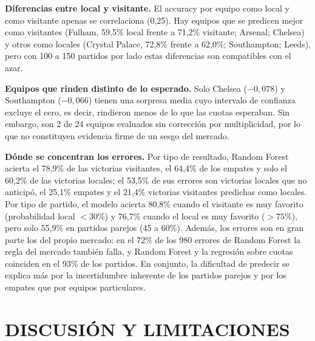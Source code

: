 \documentclass[12pt,letterpaper,oneside]{report}
\begin{document}
\textbf{Diferencias entre local y visitante.} El accuracy por equipo como local y como visitante apenas se correlaciona (0,25). Hay equipos que se predicen mejor como visitantes (Fulham, 59,5\% local frente a 71,2\% visitante; Arsenal; Chelsea) y otros como locales (Crystal Palace, 72,8\% frente a 62,0\%; Southampton; Leeds), pero con 100 a 150 partidos por lado estas diferencias son compatibles con el azar.

\textbf{Equipos que rinden distinto de lo esperado.} Solo Chelsea ($-0{,}078$) y Southampton ($-0{,}066$) tienen una sorpresa media cuyo intervalo de confianza excluye el cero, es decir, rindieron menos de lo que las cuotas esperaban. Sin embargo, son 2 de 24 equipos evaluados sin corrección por multiplicidad, por lo que no constituyen evidencia firme de un sesgo del mercado.

\textbf{Dónde se concentran los errores.} Por tipo de resultado, Random Forest acierta el 78,9\% de las victorias visitantes, el 64,4\% de los empates y solo el 60,2\% de las victorias locales; el 53,5\% de sus errores son victorias locales que no anticipó, el 25,1\% empates y el 21,4\% victorias visitantes predichas como locales. Por tipo de partido, el modelo acierta 80,8\% cuando el visitante es muy favorito (probabilidad local $<30\%$) y 76,7\% cuando el local es muy favorito ($>75\%$), pero solo 55,9\% en partidos parejos (45 a 60\%). Además, los errores son en gran parte los del propio mercado: en el 72\% de los 980 errores de Random Forest la regla del mercado también falla, y Random Forest y la regresión sobre cuotas coinciden en el 93\% de los partidos. En conjunto, la dificultad de predecir se explica más por la incertidumbre inherente de los partidos parejos y por los empates que por equipos particulares.

\chapter{DISCUSIÓN Y LIMITACIONES}
\label{sec:discusion}
\end{document}
